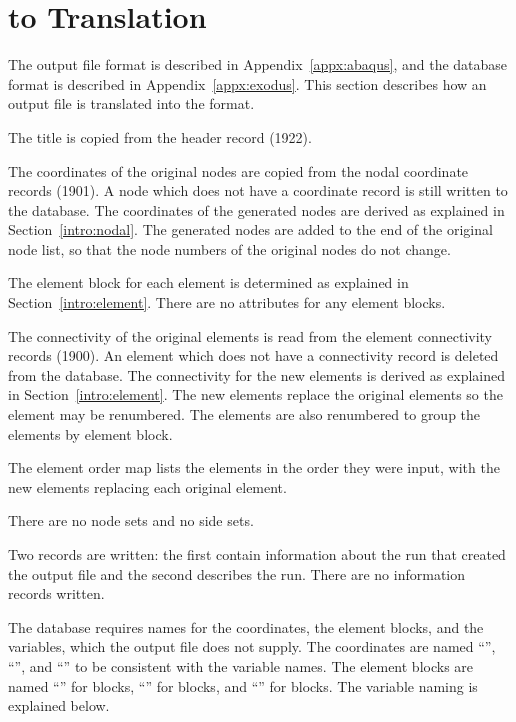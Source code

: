 \chapter{ to  Translation} \label{chap:trans}

The  output file format is described in
Appendix~\ref{appx:abaqus}, and the  database format is
described in Appendix~\ref{appx:exodus}. This section describes how an
 output file is translated into the  format.

The  title is copied from the  header record
(1922). 

The coordinates of the original nodes are copied from the 
nodal coordinate records (1901). A node which does not have a coordinate
record is still written to the  database.
The coordinates of the generated nodes
are derived as explained in Section~\ref{intro:nodal}.
The generated nodes are added to the end of
the original node list, so that the node numbers of the original nodes
do not change.

The element block for each element is determined as explained in
Section~\ref{intro:element}.
There are no attributes for any element blocks.

The connectivity of the original elements is read from the  element
connectivity records (1900). 
An element which does not have a connectivity record is deleted from the
 database.
The connectivity for the new elements is derived as explained in Section~\ref{intro:element}.
The new elements replace the original
elements so the element may be renumbered. 
The elements are also renumbered to group the 
elements by element block.

The element order map lists the elements in the order they were input,
with the new elements replacing each original element.

There are no node sets and no side sets.

Two  records are written: the first contain information about
the  run that created the output file and the second
describes the \caps{\PROGRAM} run. There are no information records
written. 

The  database requires names for the coordinates, the
element blocks, and the variables, which the  output file does
not supply. 
The coordinates are named ``'', ``'', and
``'' to be consistent with the variable names. 
The element blocks are named ``'' for  blocks,
``'' for  blocks, and ``'' for  blocks.
The variable naming is explained below.

